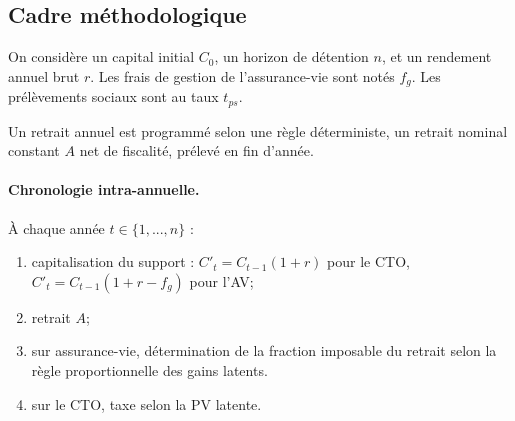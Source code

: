\subsection{Cadre méthodologique}
\label{sec:methodologie_avec_retrait}

On considère un capital initial \(C_0\), un horizon de détention \(n\), et un rendement annuel brut \(r\). Les frais de gestion de l'assurance-vie sont notés \(f_g\). Les prélèvements sociaux sont au taux \(t_{ps}\).

Un retrait annuel est programmé selon une règle déterministe, un retrait nominal constant \(A\) net de fiscalité, prélevé en fin d'année.

\paragraph{Chronologie intra-annuelle.} À chaque année \(t \in \{1, ..., n\}\) :
\begin{enumerate}
    \item capitalisation du support : \(C'_{t} = C_{t-1}(1 + r)\) pour le CTO, \(C'_{t} = C_{t-1}(1 + r - f_g)\) pour l'AV;
    \item retrait \(A\);
    \item sur assurance-vie, détermination de la fraction imposable du retrait selon la règle proportionnelle des gains latents.
    \item sur le CTO, taxe selon la PV latente.
\end{enumerate}
